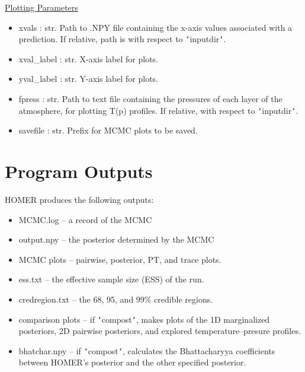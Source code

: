 \documentclass[letterpaper, 12pt]{article}
\begin{document}
\noindent \underline{Plotting Parameters}
\begin{itemize}
\item xvals      : str.  Path to .NPY file containing the x-axis values 
                         associated with a prediction.
                         If relative, path is with respect to 
                         \texttt{`}inputdir\texttt{`}.
\item xval\_label : str.  X-axis label for plots.
\item yval\_label : str.  Y-axis label for plots.
\item fpress     : str.  Path to text file containing the pressures of each 
                         layer of the atmosphere, for plotting T(p) profiles.
                         If relative, with respect to 
                         \texttt{`}inputdir\texttt{`}.
\item savefile   : str.  Prefix for MCMC plots to be saved.
\end{itemize}



\section{Program Outputs}
\label{sec:outputs}

HOMER produces the following outputs:

\begin{itemize}
\item MCMC.log -- a record of the MCMC
\item output.npy -- the posterior determined by the MCMC
\item MCMC plots -- pairwise, posterior, PT, and trace plots.
\item ess.txt -- the effective sample size (ESS) of the run.
\item credregion.txt -- the 68, 95, and 99\% credible regions.
\item comparison plots -- if \texttt{`}compost\texttt{`}, makes plots of the 
                          1D marginalized 
                          posteriors, 2D pairwise posteriors, and explored 
                          temperature--presure profiles.
\item bhatchar.npy -- if \texttt{`}compost\texttt{`}, calculates the 
                      Bhattacharyya coefficients between HOMER's posterior and 
                      the other specified posterior.
\end{itemize}
\end{document}
